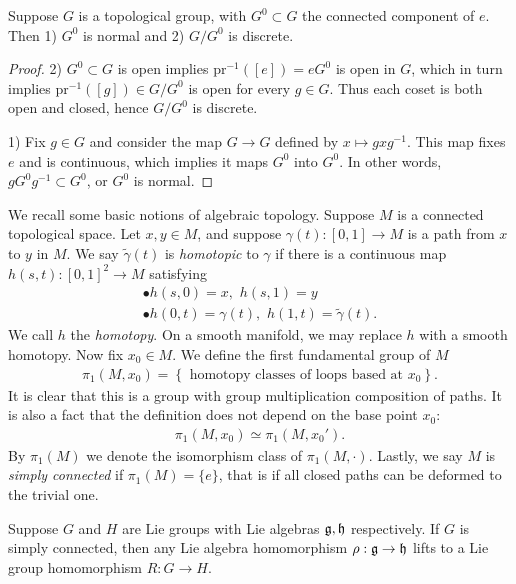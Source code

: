 \begin{theorem}
Suppose $G$ is a topological group, with $G^0 \subset G$ the connected component of
$e$.  Then 1) $G^0$ is normal and 2) $G / G^0$ is discrete.
\end{theorem}

\begin{proof}
2) $G^0 \subset G$ is open implies $\text{pr}^{-1}( [e]) = e G^0$ is open in $G$,
which in turn implies $\text{pr}^{-1}([g]) \in G/G^0$ is open for every $g \in G$.
Thus each coset is both open and closed, hence $G/G^0$ is discrete.

1) Fix $g \in G$ and consider the map $G \to G$ defined by $x \mapsto g x g^{-1}$.
This map fixes $e$ and is continuous, which implies it maps $G^0$ into $G^0$.  In
other words, $g G^0 g^{-1} \subset G^0$, or $G^0$ is normal.
\end{proof}

We recall some basic notions of algebraic topology.  Suppose $M$ is a connected
topological space.  Let $x, y \in M$, and suppose $\gamma(t): [0,1] \to M$ is a path
from $x$ to $y$ in $M$.  We say $\tilde{\gamma}(t)$ is {\it homotopic} to $\gamma$ if
there is a continuous map $h(s,t): [0,1]^2 \to M$ satisfying
\begin{eqnarray*}
\bullet h(s,0) = x, \,\, h(s,1) = y \\
\bullet h(0,t) = \gamma(t), \,\, h(1,t) = \tilde{\gamma}(t).
\end{eqnarray*}
We call $h$ the {\it homotopy}.  On a smooth manifold, we may replace $h$ with a
smooth homotopy.  Now fix $x_0 \in M$.  We define the first fundamental group of $M$
\begin{eqnarray*}
\pi_1(M, x_0) = \left\{ \text{ homotopy classes of loops based at }x_0 \right\}.
\end{eqnarray*}
It is clear that this is a group with group multiplication composition of paths.  It
is also a fact that the definition does not depend on the base point $x_0$:
\begin{eqnarray*}
\pi_1(M, x_0) \simeq \pi_1(M, x_0').
\end{eqnarray*}
By $\pi_1(M)$ we denote the isomorphism class of $\pi_1(M, \cdot)$. Lastly, we say $M$
is {\it simply connected} if $\pi_1(M) = \{e\}$, that is if all closed paths can be
deformed to the trivial one.

\begin{theorem}
\label{lec04T:4} Suppose $G$ and $H$ are Lie groups with Lie algebras $\mathfrak{g}, \mathfrak{h}$
respectively. If $G$ is simply connected, then any Lie algebra homomorphism $\rho: \mathfrak{g}
\to \mathfrak{h}$ lifts to a Lie group homomorphism $R : G \to H$.
\end{theorem}

